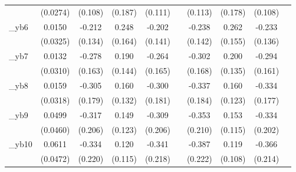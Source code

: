 \begin{table}[htbp]
\begin{tabular}{l*{9}{c}}
            &    (0.0274)         &     (0.108)         &     (0.187)         &     (0.111)         &                     &     (0.113)         &     (0.178)         &     (0.108)         &                     \\
[1em]
\_yb6        &      0.0150         &      -0.212         &       0.248         &      -0.202         &                     &      -0.238\sym{*}  &       0.262\sym{*}  &      -0.233\sym{*}  &                     \\
            &    (0.0325)         &     (0.134)         &     (0.164)         &     (0.141)         &                     &     (0.142)         &     (0.155)         &     (0.136)         &                     \\
[1em]
\_yb7        &      0.0132         &      -0.278\sym{*}  &       0.190         &      -0.264         &                     &      -0.302\sym{*}  &       0.200         &      -0.294\sym{*}  &                     \\
            &    (0.0310)         &     (0.163)         &     (0.144)         &     (0.165)         &                     &     (0.168)         &     (0.135)         &     (0.161)         &                     \\
[1em]
\_yb8        &      0.0159         &      -0.305\sym{*}  &       0.160         &      -0.300\sym{*}  &                     &      -0.337\sym{*}  &       0.160         &      -0.334\sym{*}  &                     \\
            &    (0.0318)         &     (0.179)         &     (0.132)         &     (0.181)         &                     &     (0.184)         &     (0.123)         &     (0.177)         &                     \\
[1em]
\_yb9        &      0.0499         &      -0.317         &       0.149         &      -0.309         &                     &      -0.353\sym{*}  &       0.153         &      -0.334\sym{*}  &                     \\
            &    (0.0460)         &     (0.206)         &     (0.123)         &     (0.206)         &                     &     (0.210)         &     (0.115)         &     (0.202)         &                     \\
[1em]
\_yb10       &      0.0611         &      -0.334         &       0.120         &      -0.341         &                     &      -0.387\sym{*}  &       0.119         &      -0.366\sym{*}  &                     \\
            &    (0.0472)         &     (0.220)         &     (0.115)         &     (0.218)         &                     &     (0.222)         &     (0.108)         &     (0.214)         &                     \\

\end{tabular}
\end{table}
